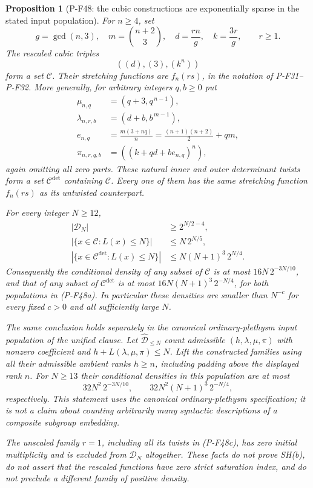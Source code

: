 \documentclass[11pt,a4paper]{article}
\newtheorem{proposition}{Proposition}[section]
\begin{document}
\begin{proposition}[P-F48: the cubic constructions are exponentially sparse in the stated input population]
For $n\ge4$, set
\[
 g=\gcd(n,3),\quad m=\binom{n+2}{3},\quad
 d=\frac{rn}{g},\quad k=\frac{3r}{g},
 \qquad r\ge1.
\]
The rescaled cubic triples
\[
                  ((d),(3),(k^n))
 \tag{P-F48b}
\]
form a set $\mathcal C$. Their stretching functions are
$f_n(rs)$, in the notation of P-F31--P-F32.
More generally, for arbitrary integers $q,b\ge0$ put
\[
 \begin{split}
  \mu_{n,q}&=(q+3,q^{\,n-1}),\\
  \lambda_{n,r,b}&=(d+b,b^{\,m-1}),\\
  e_{n,q}&=\frac{m(3+nq)}n
          =\frac{(n+1)(n+2)}2+qm,\\
  \pi_{n,r,q,b}&=((k+qd+be_{n,q})^n),
 \end{split}
 \tag{P-F48c}
\]
again omitting all zero parts. These natural inner and outer
determinant twists form a set $\mathcal C^{\det}$ containing
$\mathcal C$. Every one of them has the same stretching
function $f_n(rs)$ as its untwisted counterpart.

For every integer $N\ge12$,
\[
 \begin{split}
 |\mathcal D_N|&\ge 2^{N/2-4},\\
 |\{x\in\mathcal C:L(x)\le N\}|
       &\le N\,2^{N/5},\\
 |\{x\in\mathcal C^{\det}:L(x)\le N\}|
       &\le N(N+1)^3\,2^{N/4}.
 \end{split}
 \tag{P-F48d}
\]
Consequently the conditional density of \emph{any} subset
of $\mathcal C$ is at most
$16N\,2^{-3N/10}$, and that of any subset of
$\mathcal C^{\det}$ is at most
$16N(N+1)^3\,2^{-N/4}$, for both populations in
(P-F48a). In particular these densities are smaller than
$N^{-c}$ for every fixed $c>0$ and all sufficiently large
$N$.

The same conclusion holds separately in the canonical
ordinary-plethysm input population of the unified clause.
Let $\widehat{\mathcal D}_{\le N}$ count admissible
$(h,\lambda,\mu,\pi)$ with nonzero coefficient and
$h+L(\lambda,\mu,\pi)\le N$. Lift the constructed
families using all their admissible ambient ranks
$h\ge n$, including padding above the displayed rank $n$.
For $N\ge13$ their conditional densities in this population
are at most
\[
 32N^2\,2^{-3N/10},\qquad
 32N^2(N+1)^3\,2^{-N/4},
 \tag{P-F48h}
\]
respectively. This statement uses the canonical
ordinary-plethysm specification; it is not a claim
about counting arbitrarily many syntactic descriptions
of a composite subgroup embedding.

The unscaled family $r=1$, including all its twists in
(P-F48c), has zero initial multiplicity and is excluded
from $\mathcal D_N$ altogether. These facts do not prove
SH(b), do not assert that the rescaled functions have zero
strict saturation index, and do not preclude a different
family of positive density.
\end{proposition}
\end{document}
